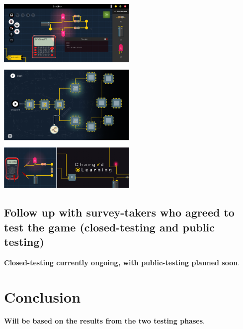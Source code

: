 \documentclass[twoside,a4paper,11pt]{article}
\begin{document}
\begin{multicols}{2}
\begin{itemize}
\end{itemize}
\begin{center}
    \includegraphics[width=0.5\textwidth]{images/game_screenshots.png}
\end{center}


\subsection{Follow up with survey-takers who agreed to test the game (closed-testing and public testing)}
 \textbf{Closed-testing currently ongoing, with public-testing planned soon}. \lipsum*[3]

 \section{Conclusion}
\textbf{Will be based on the results from the two testing phases}. \lipsum*[3]
\printbibliography
\end{multicols}
\end{document}
